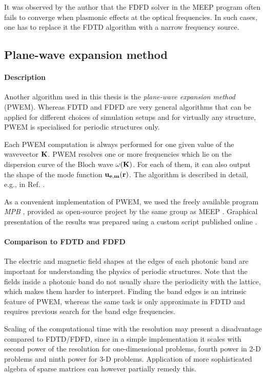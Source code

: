 It was observed by the author that the FDFD solver in the MEEP program often fails to converge when plasmonic effects at the optical frequencies. In such cases, one has to replace it the FDTD algorithm with a narrow frequency source.


\subsection{Plane-wave expansion method} %
\paragraph{Description} %
Another algorithm used in this thesis is the \textit{plane-wave expansion method} (PWEM). Whereas FDTD and FDFD are very general algorithms that can be applied for different choices of simulation setups and for virtually any structure, PWEM is specialised for periodic structures only. 

Each PWEM computation is always performed for one given value of the wavevector ${\mathbf{K}}$. PWEM resolves one or more frequencies which lie on the dispersion curve of the Bloch wave $\omega({\mathbf{K}})$. For each of them, it can also output the shape of the mode function $\mathbf{u_{e,m}}({\mathbf{r}})$. The algorithm is described in detail, e.g., in Ref. \cite[pp. 24-28]{pazoutova2011dp}.

As a convenient implementation of PWEM, we used the freely available program \textit{MPB} \cite{johnson2001mpb}, provided as open-source project by the same group as MEEP \cite{ab-initio}. Graphical presentation of the results was prepared using a custom script published online \cite{dominec2015_mpb}.

\paragraph{Comparison to FDTD and FDFD} %
The electric and magnetic field shapes at the edges of each photonic band are important for understanding the physics of periodic structures. Note that the fields inside a photonic band do not usually share the periodicity with the lattice, which makes them harder to interpret. Finding the band edges is an intrinsic feature of PWEM, whereas the same task is only approximate in FDTD and requires previous search for the band edge frequencies. 

Scaling of the computational time with the resolution may present a disadvantage compared to FDTD/FDFD, since in a simple implementation it scales with second power of the resolution for one-dimensional problems, fourth power in 2-D problems and ninth power for 3-D problems. Application of more sophisticated algebra of sparse matrices can however partially remedy this.

